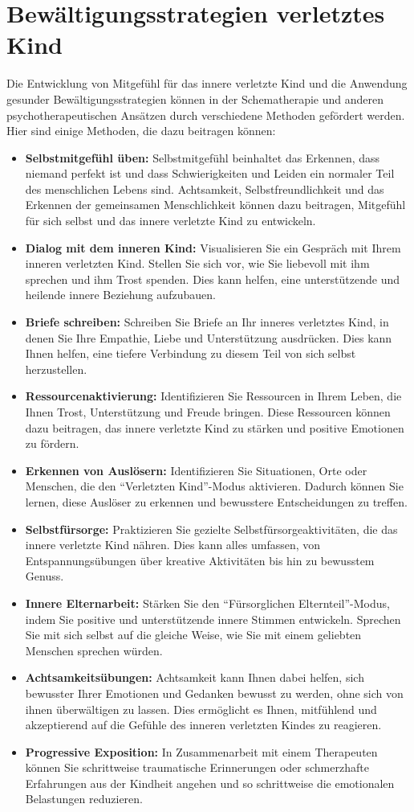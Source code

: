 \section{Bewältigungsstrategien verletztes Kind}
Die Entwicklung von Mitgefühl für das innere verletzte Kind und die Anwendung gesunder Bewältigungsstrategien können in der Schematherapie und anderen psychotherapeutischen Ansätzen durch verschiedene Methoden gefördert werden. Hier sind einige Methoden, die dazu beitragen können:
\begin{itemize}
    \item \textbf{Selbstmitgefühl üben:} Selbstmitgefühl beinhaltet das Erkennen, dass niemand perfekt ist und dass Schwierigkeiten und Leiden ein normaler Teil des menschlichen Lebens sind. Achtsamkeit, Selbstfreundlichkeit und das Erkennen der gemeinsamen Menschlichkeit können dazu beitragen, Mitgefühl für sich selbst und das innere verletzte Kind zu entwickeln.
    \item \textbf{Dialog mit dem inneren Kind:} Visualisieren Sie ein Gespräch mit Ihrem inneren verletzten Kind. Stellen Sie sich vor, wie Sie liebevoll mit ihm sprechen und ihm Trost spenden. Dies kann helfen, eine unterstützende und heilende innere Beziehung aufzubauen.
    \item \textbf{Briefe schreiben:} Schreiben Sie Briefe an Ihr inneres verletztes Kind, in denen Sie Ihre Empathie, Liebe und Unterstützung ausdrücken. Dies kann Ihnen helfen, eine tiefere Verbindung zu diesem Teil von sich selbst herzustellen.
    \item \textbf{Ressourcenaktivierung:} Identifizieren Sie Ressourcen in Ihrem Leben, die Ihnen Trost, Unterstützung und Freude bringen. Diese Ressourcen können dazu beitragen, das innere verletzte Kind zu stärken und positive Emotionen zu fördern.
    \item \textbf{Erkennen von Auslösern:} Identifizieren Sie Situationen, Orte oder Menschen, die den \enquote{Verletzten Kind}-Modus aktivieren. Dadurch können Sie lernen, diese Auslöser zu erkennen und bewusstere Entscheidungen zu treffen.
    \item \textbf{Selbstfürsorge:} Praktizieren Sie gezielte Selbstfürsorgeaktivitäten, die das innere verletzte Kind nähren. Dies kann alles umfassen, von Entspannungsübungen über kreative Aktivitäten bis hin zu bewusstem Genuss.
    \item \textbf{Innere Elternarbeit:} Stärken Sie den \enquote{Fürsorglichen Elternteil}-Modus, indem Sie positive und unterstützende innere Stimmen entwickeln. Sprechen Sie mit sich selbst auf die gleiche Weise, wie Sie mit einem geliebten Menschen sprechen würden.
    \item \textbf{Achtsamkeitsübungen:} Achtsamkeit kann Ihnen dabei helfen, sich bewusster Ihrer Emotionen und Gedanken bewusst zu werden, ohne sich von ihnen überwältigen zu lassen. Dies ermöglicht es Ihnen, mitfühlend und akzeptierend auf die Gefühle des inneren verletzten Kindes zu reagieren.
    \item \textbf{Progressive Exposition:} In Zusammenarbeit mit einem Therapeuten können Sie schrittweise traumatische Erinnerungen oder schmerzhafte Erfahrungen aus der Kindheit angehen und so schrittweise die emotionalen Belastungen reduzieren.
\end{itemize}
